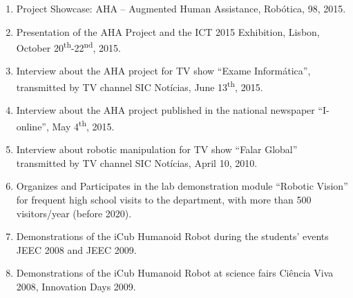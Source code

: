 \begin{enumerate}
  2016.
\item
  Project Showcase: AHA -- Augmented Human Assistance, Robótica, 98,
  2015.
\item
  Presentation of the AHA Project and the ICT 2015 Exhibition, Lisbon,
  October 20\textsuperscript{th}-22\textsuperscript{nd}, 2015.
\item
  Interview about the AHA project for TV show ``Exame Informática'',
  transmitted by TV channel SIC Notícias, June 13\textsuperscript{th},
  2015.
\item
  Interview about the AHA project published in the national newspaper
  ``I-online'', May 4\textsuperscript{th}, 2015.
\item
  Interview about robotic manipulation for TV show ``Falar Global''
  transmitted by TV channel SIC Notícias, April 10, 2010.
\item
  Organizes and Participates in the lab demonstration module ``Robotic
  Vision'' for frequent high school visits to the department, with more
  than 500 visitors/year (before 2020).
\item
  Demonstrations of the iCub Humanoid Robot during the students' events
  JEEC 2008 and JEEC 2009.
\item
  Demonstrations of the iCub Humanoid Robot at science fairs Ciência
  Viva 2008, Innovation Days 2009.
\end{enumerate}
